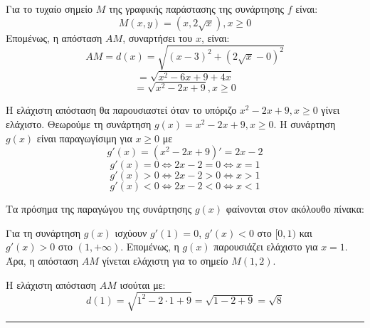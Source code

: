 \begin{alist}
\item Για το τυχαίο σημείο $M$ της γραφικής παράστασης της συνάρτησης $f$ είναι:
\[ M(x, y) = (x, 2\sqrt{x}), x \ge 0 \]
Επομένως, η απόσταση $AM$, συναρτήσει του $x$, είναι:
\[ AM = d(x) = \sqrt{(x-3)^2 + (2\sqrt{x}-0)^2} \]
\[ = \sqrt{x^2 - 6x + 9 + 4x} \]
\[ = \sqrt{x^2 - 2x + 9}, x \ge 0 \]
\item Η ελάχιστη απόσταση θα παρουσιαστεί όταν το υπόριζο $x^2 - 2x + 9, x \ge 0$ γίνει ελάχιστο. Θεωρούμε τη συνάρτηση $g(x) = x^2 - 2x + 9, x \ge 0$.
Η συνάρτηση $g(x)$ είναι παραγωγίσιμη για $x \ge 0$ με
\[ g'(x) = (x^2 - 2x + 9)' = 2x - 2 \]
\[ g'(x) = 0 \Leftrightarrow 2x - 2 = 0 \Leftrightarrow x = 1 \]
\[ g'(x) > 0 \Leftrightarrow 2x - 2 > 0 \Leftrightarrow x > 1 \]
\[ g'(x) < 0 \Leftrightarrow 2x - 2 < 0 \Leftrightarrow x < 1 \]

Τα πρόσημα της παραγώγου της συνάρτησης $g(x)$ φαίνονται στον ακόλουθο πίνακα:
\begin{center}
\end{center}
Για τη συνάρτηση $g(x)$ ισχύουν $g'(1)=0$, $g'(x)<0$ στο $[0,1)$ και $g'(x)>0$ στο $(1,+\infty)$. Επομένως, η $g(x)$ παρουσιάζει ελάχιστο για $x=1$.
Άρα, η απόσταση $AM$ γίνεται ελάχιστη για το σημείο $M(1,2)$.
\item Η ελάχιστη απόσταση $AM$ ισούται με:
\[ d(1) = \sqrt{1^2 - 2 \cdot 1 + 9} = \sqrt{1 - 2 + 9} = \sqrt{8} \]
\end{alist}
\vspace{6mm}
\noindent\rule{\textwidth}{0.4pt}
\vspace{6mm}

